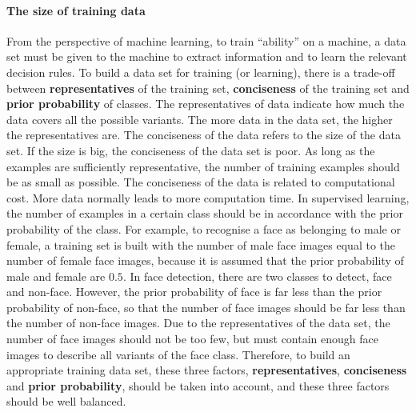 \paragraph{The size of training data}
From the perspective of machine learning, to train ``ability'' on a machine, a data set must be given to the machine to extract information and to learn the relevant decision rules. To build a data set for training (or learning), there is a trade-off between \textbf{representatives} of the training set, \textbf{conciseness} of the training set and \textbf{prior probability} of classes. The representatives of data indicate how much the data covers all the possible variants. The more data in the data set, the higher the representatives are. The conciseness of the data refers to the size of the data set. If the size is big, the conciseness of the data set is poor. As long as the examples are sufficiently representative, the number of training examples should be as small as possible. The conciseness of the data is related to computational cost. More data normally leads to more computation time. In supervised learning, the number of examples in a certain class should be in accordance with the prior probability of the class. For example, to recognise a face as belonging to male or female, a training set is built with the number of male face images equal to the number of female face images, because it is assumed that the prior probability of male and female are $0.5$. In face detection, there are two classes to detect, face and non-face. However, the prior probability of face is far less than the prior probability of non-face, so that the number of face images should be far less than the number of non-face images. Due to the representatives of the data set, the number of face images should not be too few, but must contain enough face images to describe all variants of the face class. Therefore, to build an appropriate training data set, these three factors, \textbf{representatives}, \textbf{conciseness} and \textbf{prior probability}, should be taken into account, and these three factors should be well balanced.

